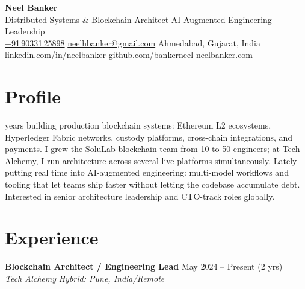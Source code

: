 \documentclass[11pt, a4paper]{article}
\newcommand{\role}[4]{%
  \noindent
  \textbf{#1} \hfill \textcolor{mutedcolor}{\small #3}\\[-2pt]
  \textit{\textcolor{accentcolor}{#2}} \hfill \textcolor{mutedcolor}{\small\textit{#4}}
  \vspace{2pt}
}
\begin{document}
\begin{center}
  {\Huge\bfseries\color{headingcolor} Neel Banker}\\[4pt]
  {\large\color{mutedcolor} Distributed Systems \& Blockchain Architect \textbar{} AI-Augmented Engineering Leadership}\\[6pt]
  \small
  \href{tel:+919033125898}{+91\,90331\,25898}\quad\textbullet\quad
  \href{mailto:neelhbanker@gmail.com}{neelhbanker@gmail.com}\quad\textbullet\quad
  Ahmedabad, Gujarat, India\\[2pt]
  \href{https://www.linkedin.com/in/neelbanker}{linkedin.com/in/neelbanker}\quad\textbullet\quad
  \href{https://github.com/bankerneel}{github.com/bankerneel}\quad\textbullet\quad
  \href{https://neelbanker.com}{neelbanker.com}
\end{center}

\vspace{2pt}

\section{Profile}

\textplus{} years building production blockchain systems: Ethereum L2 ecosystems, Hyperledger Fabric networks, custody platforms, cross-chain integrations, and payments. I grew the SoluLab blockchain team from 10 to 50\textplus{} engineers; at Tech Alchemy, I run architecture across several live platforms simultaneously. Lately putting real time into AI-augmented engineering: multi-model workflows and tooling that let teams ship faster without letting the codebase accumulate debt. Interested in senior architecture leadership and CTO-track roles globally.

\section{Experience}

\role{Blockchain Architect / Engineering Lead}{Tech Alchemy}{May 2024 – Present (2\textplus{} yrs)}{Hybrid: Pune, India/Remote}
\end{document}
